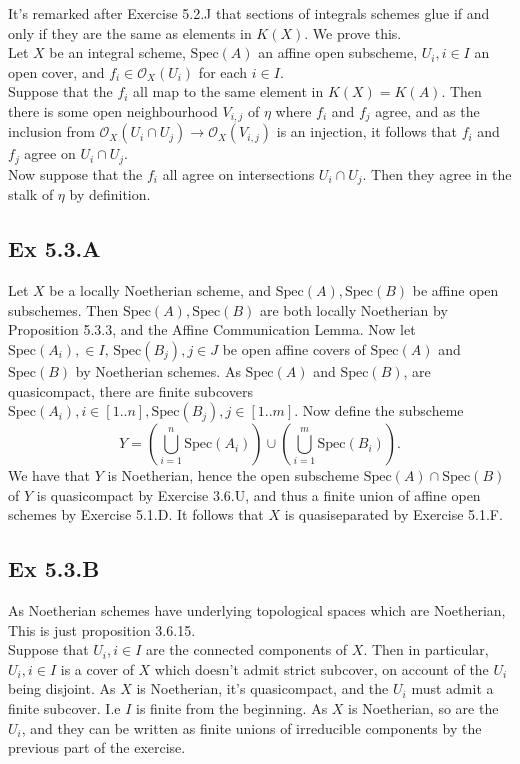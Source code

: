 \documentclass{article}
\theoremstyle{definition}
\newcommand{\ox}{\mathcal{O}_X}
\newcommand{\Spec}{\text{Spec}}
\begin{document}
It's remarked after Exercise 5.2.J that sections of integrals schemes glue if
and only if they are the same as elements in $K(X)$. We prove this. \\

Let $X$ be an integral scheme, $\Spec(A)$ an affine open subscheme, $U_i, i \in
I$ an open cover, and $f_i \in \ox(U_i)$ for each $i \in I$. \\

Suppose that the $f_i$ all map to the same element in $K(X) = K(A)$. Then there
is some open neighbourhood $V_{i,j}$ of $\eta$ where $f_i$ and $f_j$ agree, and
as the inclusion from $\ox(U_i \cap U_j) \to \ox(V_{i, j})$ is an injection, it
follows that $f_i$ and $f_j$ agree on $U_i \cap U_j$. \\

Now suppose that the $f_i$ all agree on intersections $U_i \cap U_j$. Then they
agree in the stalk of $\eta$ by definition.

\subsection*{Ex 5.3.A}

Let $X$ be a locally Noetherian scheme, and $\Spec(A), \Spec(B)$ be affine open
subschemes. Then $\Spec(A), \Spec(B)$ are both locally Noetherian by
Proposition 5.3.3, and the Affine Communication Lemma. Now let $\Spec(A_i), \in
I,\, \Spec(B_j), j \in J$ be open affine covers of $\Spec(A)$ and $\Spec(B)$ by
Noetherian schemes. As $\Spec(A)$ and $\Spec(B)$, are quasicompact, there are
finite subcovers $\Spec(A_i), i \in [1..n], \Spec(B_j), j \in [1..m]$. Now
define the subscheme
\[
	Y
	=
	\left(
	\bigcup_{i = 1}^{n} \Spec(A_i)
	\right)
	\cup
	\left(
	\bigcup_{i = 1}^{m} \Spec(B_i)
	\right).
\] 
We have that $Y$ is Noetherian, hence the open subscheme $\Spec(A) \cap
\Spec(B)$ of $Y$ is quasicompact by Exercise 3.6.U, and thus a finite union of
affine open schemes by Exercise 5.1.D. It follows that $X$ is quasiseparated by
Exercise 5.1.F.

\subsection*{Ex 5.3.B}

As Noetherian schemes have underlying topological spaces which are Noetherian,
This is just proposition 3.6.15. \\

Suppose that $U_i, i \in I$ are the connected components of $X$. Then in
particular, $U_i, i \in I$ is a cover of $X$ which doesn't admit strict
subcover, on account of the $U_i$ being disjoint. As $X$ is Noetherian, it's
quasicompact, and the $U_i$ must admit a finite subcover. I.e $I$ is finite
from the beginning. As $X$ is Noetherian, so are the $U_i$, and they can be
written as finite unions of irreducible components by the previous part of the
exercise.
\end{document}
